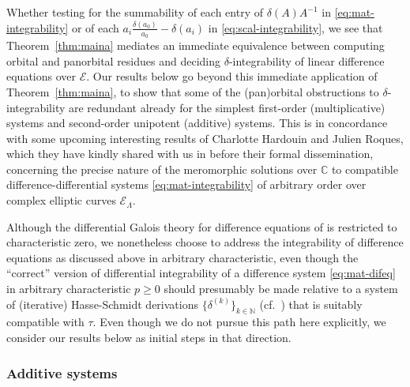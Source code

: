 \documentclass[preprint,12pt]{elsarticle}
\numberwithin{equation}{section} %
\theoremstyle{theorem}
\theoremstyle{definition}
\newcommand{\ec}{\mathcal{E}} %
\newcommand{\ecl}{\ec_{\Lambda}} %
\newcommand{\C}{\mathbb{C}} %
\begin{document}
Whether testing for the summability of each entry of $\delta(A)A^{-1}$ in \eqref{eq:mat-integrability} or of each $a_i\frac{\delta(a_0)}{a_0}-\delta(a_i)$ in \eqref{eq:scal-integrability}, we see that Theorem~\ref{thm:maina} mediates an immediate equivalence between computing orbital and panorbital residues and deciding $\delta$-integrability of linear difference equations over $\ec$. Our results below go beyond this immediate application of Theorem~\ref{thm:maina}, to show that some of the (pan)orbital obstructions to $\delta$-integrability are redundant already for the simplest first-order (multiplicative) systems and second-order unipotent (additive) systems. This is in concordance with some upcoming interesting results of Charlotte Hardouin and Julien Roques, which they have kindly shared with us in \cite{hardouin-roques:2023} before their formal dissemination, concerning the precise nature of the meromorphic solutions over $\C$ to compatible difference-differential systems \eqref{eq:mat-integrability} of arbitrary order over complex elliptic curves $\ecl$.

Although the differential Galois theory for difference equations of \cite{HardouinSinger2008} is restricted to characteristic zero, we nonetheless choose to address the integrability of difference equations as discussed above in arbitrary characteristic, even though the ``correct'' version of differential integrability of a difference system \eqref{eq:mat-difeq} in arbitrary characteristic $p\geq 0$ should presumably be made relative to a system of (iterative) Hasse-Schmidt derivations $\{\delta^{(k)}\}_{k\in\mathbb{N}}$ (cf.~\cite{iterative}) that is suitably compatible with $\tau$. Even though we do not pursue this path here explicitly, we consider our results below as initial steps in that direction.

\subsubsection{Additive systems}
\end{document}
